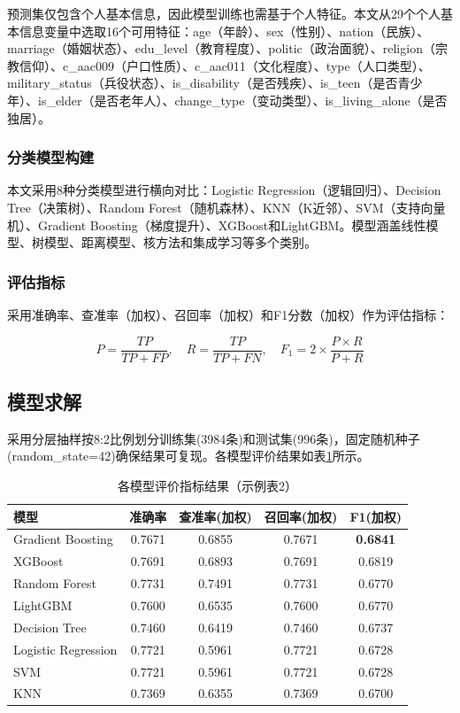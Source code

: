 \documentclass[withoutpreface,bwprint]{cumcmthesis}
\begin{document}
预测集仅包含个人基本信息，因此模型训练也需基于个人特征。本文从29个个人基本信息变量中选取16个可用特征：age（年龄）、sex（性别）、nation（民族）、marriage（婚姻状态）、edu\_level（教育程度）、politic（政治面貌）、religion（宗教信仰）、c\_aac009（户口性质）、c\_aac011（文化程度）、type（人口类型）、military\_status（兵役状态）、is\_disability（是否残疾）、is\_teen（是否青少年）、is\_elder（是否老年人）、change\_type（变动类型）、is\_living\_alone（是否独居）。

\subsubsection{分类模型构建}

本文采用8种分类模型进行横向对比：Logistic Regression（逻辑回归）、Decision Tree（决策树）、Random Forest（随机森林）、KNN（K近邻）、SVM（支持向量机）、Gradient Boosting（梯度提升）、XGBoost和LightGBM。模型涵盖线性模型、树模型、距离模型、核方法和集成学习等多个类别。

\subsubsection{评估指标}

采用准确率、查准率（加权）、召回率（加权）和F1分数（加权）作为评估指标：

\begin{equation}
P = \frac{TP}{TP + FP}, \quad R = \frac{TP}{TP + FN}, \quad F_1 = 2 \times \frac{P \times R}{P + R}
\end{equation}

\subsection{模型求解}

采用分层抽样按8:2比例划分训练集(3984条)和测试集(996条)，固定随机种子(random\_state=42)确保结果可复现。各模型评价结果如表\ref{tab:model_eval}所示。

\begin{table}[H]
\centering
\caption{各模型评价指标结果（示例表2）}
\begin{tabular}{lcccc}
\toprule
模型 & 准确率 & 查准率(加权) & 召回率(加权) & F1(加权) \\
\midrule
Gradient Boosting & 0.7671 & 0.6855 & 0.7671 & \textbf{0.6841} \\
XGBoost           & 0.7691 & 0.6893 & 0.7691 & 0.6819 \\
Random Forest      & 0.7731 & 0.7491 & 0.7731 & 0.6770 \\
LightGBM           & 0.7600 & 0.6535 & 0.7600 & 0.6770 \\
Decision Tree      & 0.7460 & 0.6419 & 0.7460 & 0.6737 \\
Logistic Regression& 0.7721 & 0.5961 & 0.7721 & 0.6728 \\
SVM                & 0.7721 & 0.5961 & 0.7721 & 0.6728 \\
KNN                & 0.7369 & 0.6355 & 0.7369 & 0.6700 \\
\bottomrule
\end{tabular}
\label{tab:model_eval}
\end{table}
\end{document}
